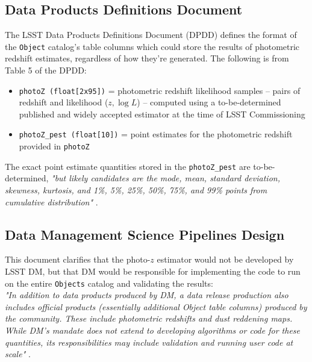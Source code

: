 \documentclass[DM,lsstdraft,toc]{lsstdoc}
\begin{document}
\subsection{Data Products Definitions Document}\label{ssec:docs_dpdd}

The LSST Data Products Definitions Document (DPDD)  defines the format of the {\tt Object} catalog's table columns which could store the results of photometric redshift estimates, regardless of how they're generated. 
The following is from Table 5 of the DPDD:
\vspace{-15pt}
\begin{itemize}
\item \texttt{photoZ (float[2x95])} = photometric redshift likelihood samples -- pairs of redshift and likelihood ($z,\log{L}$) -- computed using a to-be-determined published and widely accepted estimator at the time of LSST Commissioning
\item \texttt{photoZ\_pest (float[10])} = point estimates for the photometric redshift provided in {\tt photoZ}
\end{itemize}

The exact point estimate quantities stored in the \texttt{photoZ\_pest} are to-be-determined, {\it "but likely candidates are the mode, mean, standard deviation, skewness, kurtosis, and 1\%, 5\%, 25\%, 50\%, 75\%, and 99\% points from cumulative distribution"} . 

\subsection{Data Management Science Pipelines Design}\label{ssec:docs_ldm151}

This document clarifies that the photo-$z$ estimator would not be developed by LSST DM, but that DM would be responsible for implementing the code to run on the entire {\tt Objects} catalog and validating the results: \\
{\it "In addition to data products produced by DM, a data release production also includes official
products (essentially additional Object table columns) produced by the community. These
include photometric redshifts and dust reddening maps. While DM's mandate does not extend
to developing algorithms or code for these quantities, its responsibilities may include validation
and running user code at scale"} .
\end{document}
